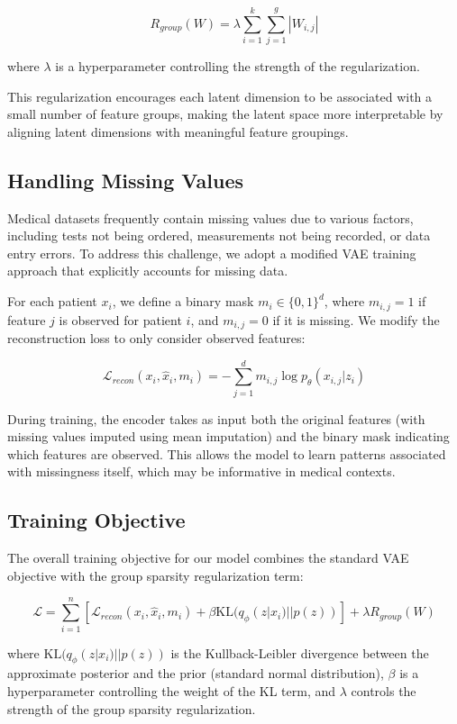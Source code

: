 \documentclass[oupdraft]{bio}
\begin{document}
$$R_{group}(W) = \lambda \sum_{i=1}^{k} \sum_{j=1}^{g} |W_{i,j}|$$

where $\lambda$ is a hyperparameter controlling the strength of the regularization.

This regularization encourages each latent dimension to be associated with a small number of feature groups, making the latent space more interpretable by aligning latent dimensions with meaningful feature groupings.

\subsection{Handling Missing Values}

Medical datasets frequently contain missing values due to various factors, including tests not being ordered, measurements not being recorded, or data entry errors. To address this challenge, we adopt a modified VAE training approach that explicitly accounts for missing data.

For each patient $x_i$, we define a binary mask $m_i \in \{0, 1\}^d$, where $m_{i,j} = 1$ if feature $j$ is observed for patient $i$, and $m_{i,j} = 0$ if it is missing. We modify the reconstruction loss to only consider observed features:

$$\mathcal{L}_{recon}(x_i, \hat{x}_i, m_i) = -\sum_{j=1}^{d} m_{i,j} \log p_\theta(x_{i,j}|z_i)$$

During training, the encoder takes as input both the original features (with missing values imputed using mean imputation) and the binary mask indicating which features are observed. This allows the model to learn patterns associated with missingness itself, which may be informative in medical contexts.

\subsection{Training Objective}

The overall training objective for our model combines the standard VAE objective with the group sparsity regularization term:

$$\mathcal{L} = \sum_{i=1}^{n} [ \mathcal{L}_{recon}(x_i, \hat{x}_i, m_i) + \beta \text{KL}(q_\phi(z|x_i) || p(z)) ] + \lambda R_{group}(W)$$

where $\text{KL}(q_\phi(z|x_i) || p(z))$ is the Kullback-Leibler divergence between the approximate posterior and the prior (standard normal distribution), $\beta$ is a hyperparameter controlling the weight of the KL term, and $\lambda$ controls the strength of the group sparsity regularization.
\end{document}
